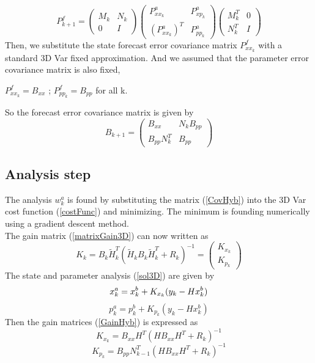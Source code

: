 \documentclass[a4,12pt]{article}
\numberwithin{equation}{section}
\begin{document}
\begin{equation}
    P_{k+1}^f =  
\begin{pmatrix}
M_k & N_k \\
 0  & I
\end{pmatrix}
\begin{pmatrix}
P_{xx_k}^a & P_{xp_k}^a \\
(P_{xx_k}^a)^T &  P_{pp_k}^a
\end{pmatrix}
\begin{pmatrix}
M_k^T & 0 \\
 N_k^T & I
\end{pmatrix}
\end{equation}
Then, we substitute the state forecast error covariance matrix $P_{xx_k}^f $ with a standard 3D Var fixed approximation. And we assumed that the parameter error covariance matrix is also fixed, 
\begin{center}
    $P_{xx_k}^f =  B_{xx}$ ; $P_{pp_k}^f = B_{pp}$ for all k.
\end{center} 
So the forecast error covariance matrix is given by
\begin{equation}
    B_{k+1} = 
\begin{pmatrix}
B_{xx} & N_k B_{pp} \\
 B_{pp}N_k^T & B_{pp}
\end{pmatrix} 
\label{CovHyb}
\end{equation}

\subsection{Analysis step}
The analysis $w_k^a$ is found by substituting the matrix (\ref{CovHyb}) into the 3D Var cost function (\ref{costFunc}) and minimizing. The minimum is founding numerically using a gradient descent method. \\
The gain matrix (\ref{matrixGain3D}) can now written as 
\begin{equation}
K_k   =   B_k \tilde H_k^T(  \tilde H_k B_k \tilde H_k^T + R_k)^{-1} = \begin{pmatrix}
K_{x_k} \\
K_{p_k} 
\end{pmatrix} 
\label{GainHyb}
\end{equation}
The state and parameter analysis (\ref{sol3D}) are given by 
\begin{equation}
    x_k^a = x_k^b + K_{x_k} (y_k -  Hx_k^b) \\
\end{equation}
\begin{equation}
    p_k^a = p_k^b + K_{p_k} (y_k -  Hx_k^b)
\end{equation}
Then the gain matrices (\ref{GainHyb}) is expressed as 
\begin{equation}
K_{x_k} = B_{xx} H^T ( HB_{xx} H^T + R_k)^{-1}
\end{equation}
\begin{equation}
K_{p_k} = B_{pp} N_{k-1}^T ( HB_{xx} H^T + R_k)^{-1}
\end{equation}
\end{document}
